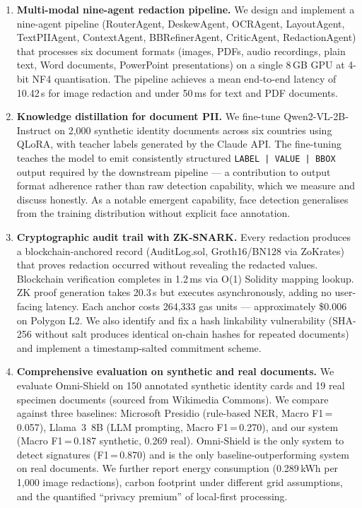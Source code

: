 \documentclass[conference]{IEEEtran}
\begin{document}
\begin{enumerate}

  \item \textbf{Multi-modal nine-agent redaction pipeline.}
  We design and implement a nine-agent pipeline
  (RouterAgent, DeskewAgent, OCRAgent, LayoutAgent,
  TextPIIAgent, ContextAgent, BBRefinerAgent,
  CriticAgent, RedactionAgent) that processes six
  document formats (images, PDFs, audio recordings,
  plain text, Word documents, PowerPoint presentations)
  on a single 8\,GB GPU at 4-bit NF4 quantisation.
  The pipeline achieves a mean end-to-end latency of
  10.42\,s for image redaction and under 50\,ms for
  text and PDF documents.

  \item \textbf{Knowledge distillation for document PII.}
  We fine-tune Qwen2-VL-2B-Instruct on 2,000 synthetic
  identity documents across six countries using QLoRA,
  with teacher labels generated by the Claude API.
  The fine-tuning teaches the model to emit consistently
  structured \texttt{LABEL\,|\,VALUE\,|\,BBOX} output
  required by the downstream pipeline --- a contribution
  to output format adherence rather than raw detection
  capability, which we measure and discuss honestly.
  As a notable emergent capability, face detection
  generalises from the training distribution without
  explicit face annotation.

  \item \textbf{Cryptographic audit trail with ZK-SNARK.}
  Every redaction produces a blockchain-anchored record
  (AuditLog.sol, Groth16/BN128 via ZoKrates) that proves
  redaction occurred without revealing the redacted values.
  Blockchain verification completes in 1.2\,ms via O(1)
  Solidity mapping lookup.
  ZK proof generation takes 20.3\,s but executes
  asynchronously, adding no user-facing latency.
  Each anchor costs 264,333 gas units --- approximately
  \$0.006 on Polygon L2.
  We also identify and fix a hash linkability
  vulnerability (SHA-256 without salt produces
  identical on-chain hashes for repeated documents)
  and implement a timestamp-salted commitment scheme.

  \item \textbf{Comprehensive evaluation on synthetic
  and real documents.}
  We evaluate Omni-Shield on 150 annotated synthetic
  identity cards and 19 real specimen documents
  (sourced from Wikimedia Commons).
  We compare against three baselines: Microsoft Presidio
  (rule-based NER, Macro F1\,=\,0.057), Llama~3~8B
  (LLM prompting, Macro F1\,=\,0.270), and our system
  (Macro F1\,=\,0.187 synthetic, 0.269 real).
  Omni-Shield is the only system to detect signatures
  (F1\,=\,0.870) and is the only baseline-outperforming
  system on real documents.
  We further report energy consumption
  (0.289\,kWh per 1,000 image redactions), carbon
  footprint under different grid assumptions, and
  the quantified ``privacy premium'' of local-first
  processing.

\end{enumerate}
\end{document}
